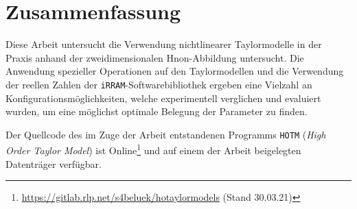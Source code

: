 \chapter*{Zusammenfassung}
Diese Arbeit untersucht die Verwendung nichtlinearer Taylormodelle in der Praxis anhand der zweidimensionalen H\e non-Abbildung untersucht. Die Anwendung spezieller Operationen auf den Taylormodellen und die Verwendung der reellen Zahlen der \verb+iRRAM+-Softwarebibliothek ergeben eine Vielzahl an Konfigurationsmöglichkeiten, welche experimentell verglichen und evaluiert wurden, um eine möglichst optimale Belegung der Parameter zu finden.

Der Quellcode des im Zuge der Arbeit entstandenen Programms \verb+HOTM+ (\textit{High Order Taylor Model}) ist Online\footnote{\url{https://gitlab.rlp.net/s4beluek/hotaylormodels} (Stand 30.03.21)} und auf einem der Arbeit beigelegten Datenträger verfügbar.
